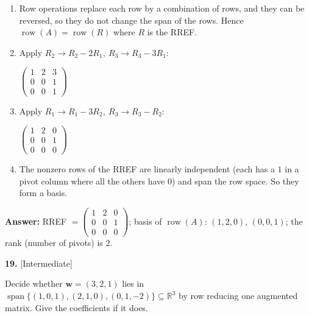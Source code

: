 \documentclass[11pt]{article}
\begin{document}
\begin{tcolorbox}[breakable,colback=ans,colframe=ansb,boxrule=0.5pt,left=4pt,right=4pt,top=2pt,bottom=2pt]\begin{enumerate}[leftmargin=2.2em,itemsep=1pt,topsep=1pt,label=\textbf{Step \arabic*.}]\item Row operations replace each row by a combination of rows, and they can be reversed, so they do not change the span of the rows. Hence $\operatorname{row}(A)=\operatorname{row}(R)$ where $R$ is the RREF.
\item Apply $R_2\to R_2-2R_1,\ R_3\to R_3-3R_1$:\par\smallskip $\displaystyle \begin{pmatrix}1 & 2 & 3 \\ 0 & 0 & 1 \\ 0 & 0 & 1\end{pmatrix}$
\item Apply $R_1\to R_1-3R_2,\ R_3\to R_3-R_2$:\par\smallskip $\displaystyle \begin{pmatrix}1 & 2 & 0 \\ 0 & 0 & 1 \\ 0 & 0 & 0\end{pmatrix}$
\item The nonzero rows of the RREF are linearly independent (each has a $1$ in a pivot column where all the others have $0$) and span the row space. So they form a basis.
\end{enumerate}\textbf{Answer:} RREF $=\begin{pmatrix}1 & 2 & 0 \\ 0 & 0 & 1 \\ 0 & 0 & 0\end{pmatrix}$; basis of $\operatorname{row}(A)$: $(1,2,0)$, $(0,0,1)$; the rank (number of pivots) is $2$.\end{tcolorbox}
\par\vspace{2pt}
\begin{minipage}{\linewidth}\textbf{19.} \hfill{\scriptsize\color{ink}[Intermediate]}\par\nopagebreak Decide whether $\mathbf w=(3,2,1)$ lies in $\operatorname{span}\{(1,0,1),(2,1,0),(0,1,-2)\}\subseteq\mathbb{R}^{3}$ by row reducing one augmented matrix. Give the coefficients if it does.
\end{minipage}\par\nopagebreak
\end{document}
